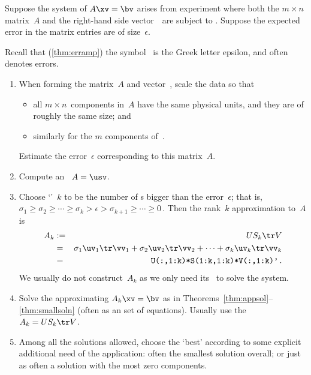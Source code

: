 \begin{procedure} \label{pro:appmat}
Suppose the system of  \(A\xv=\bv\) arises from experiment where both the \(m\times n\) matrix~\(A\) and the right-hand side vector~\bv\ are subject to .  
Suppose the expected error in the matrix entries are of size~\(\epsilon\).
\begin{aside}
Recall that (\autoref{thm:erramp}) the symbol~\idx{$\epsilon$} is the Greek letter epsilon, and often denotes errors.
\end{aside}%
\begin{enumerate}
\item When forming the matrix~\(A\) and vector~\bv, scale the data so that 
\begin{itemize}
\item all \(m\times n\)~components in~\(A\) have the same physical units, and they are of roughly the same size; and
\item similarly for the \(m\) components of~\bv.
\end{itemize}
Estimate the error~\(\epsilon\) corresponding to this matrix~\(A\).
 
\item Compute an \svd\ \(A=\usv\).

\item Choose `'~\(k\) to be the number of s bigger than the error~\(\epsilon\); that is, \(\sigma_1\geq \sigma_2\geq\cdots \geq \sigma_k>\epsilon>\sigma_{k+1}\geq \cdots\geq 0\)\,.
Then the rank~\(k\) approximation to~\(A\) is
\begin{eqnarray*}
A_k&:=&US_k\tr V
\\&=&\sigma_1\uv_1\tr\vv_1+\sigma_2\uv_2\tr\vv_2+\cdots+\sigma_k\uv_k\tr\vv_k
\\&=&\verb|U(:,1:k)*S(1:k,1:k)*V(:,1:k)'|\,.
\end{eqnarray*}
We usually do not construct~\(A_k\) as we only need its \svd\ to solve the system.

\item Solve the approximating  \(A_k\xv=\bv\) as in Theorems~\ref{thm:appsol}--\ref{thm:smallsoln} (often as an  set of equations).
Usually use the \svd\ \(A_k=US_k\tr V\).

\item Among all the solutions allowed, choose the `best' according to some explicit additional need of the application: often the smallest solution overall; or just as often a solution with the most zero components.
\end{enumerate}
\end{procedure}


